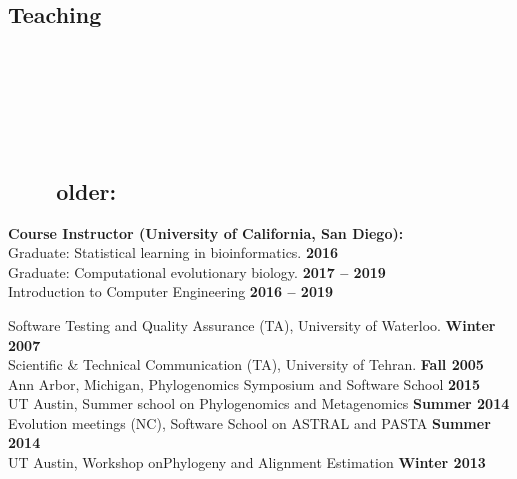 \documentclass[margin,line,letterpaper]{resume}
\begin{document}
\begin{resume}
    \section{\mysidestyle Teaching\\~\\~\\~\\~\\~\\~~~~older:}

    \textbf{Course Instructor (University of California, San Diego):}\vspace{2mm}\\\vspace{1mm}%
     Graduate: Statistical learning in bioinformatics. \hfill \textbf{2016}\\
     Graduate:  Computational evolutionary biology. \hfill \textbf{2017 -- 2019}\\
     Introduction to Computer Engineering  \hfill \textbf{2016 -- 2019}


    Software Testing and Quality Assurance (TA), University of Waterloo.  \hfill \textbf{Winter 2007}\\
    Scientific \& Technical Communication (TA), University of Tehran.  \hfill \textbf{Fall 2005}\\
%
    Ann Arbor, Michigan, Phylogenomics Symposium and Software School \hfill \textbf{2015}\\
    UT Austin, Summer school on Phylogenomics and Metagenomics \hfill \textbf{Summer 2014}\\
    Evolution meetings (NC), Software School on ASTRAL and PASTA \hfill \textbf{Summer 2014}\\
    UT Austin, Workshop onPhylogeny and Alignment Estimation \hfill \textbf{Winter 2013}
%


\end{resume}
\end{document}
